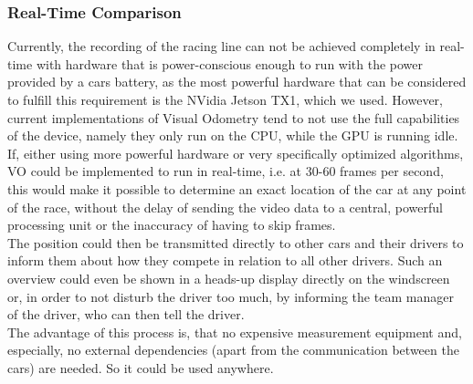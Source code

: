 \subsubsection{Real-Time Comparison}
Currently, the recording of the racing line can not be achieved completely in real-time with hardware that is power-conscious enough to run with the power provided by a cars battery, as the most powerful hardware that can be considered to fulfill this requirement is the NVidia Jetson TX1, which we used. However, current implementations of Visual Odometry tend to not use the full capabilities of the device, namely they only run on the CPU, while the GPU is running idle. If, either using more powerful hardware or very specifically optimized algorithms, VO could be implemented to run in real-time, i.e. at 30-60 frames per second, this would make it possible to determine an exact location of the car at any point of the race, without the delay of sending the video data to a central, powerful processing unit or the inaccuracy of having to skip frames.\\
The position could then be transmitted directly to other cars and their drivers to inform them about how they compete in relation to all other drivers. Such an overview could even be shown in a heads-up display directly on the windscreen or, in order to not disturb the driver too much, by informing the team manager of the driver, who can then tell the driver.\\
The advantage of this process is, that no expensive measurement equipment and, especially, no external dependencies (apart from the communication between the cars) are needed. So it could be used anywhere.

\clearpage